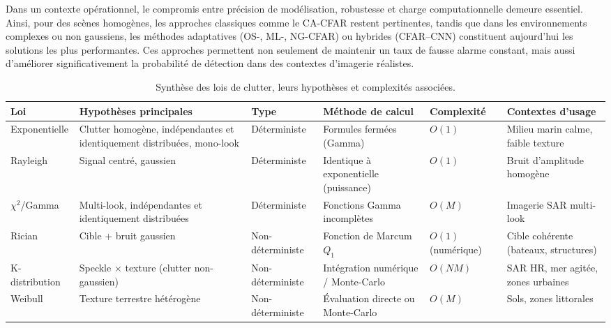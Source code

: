 Dans un contexte opérationnel, le compromis entre précision de modélisation, robustesse et charge computationnelle demeure essentiel.  
Ainsi, pour des scènes homogènes, les approches classiques comme le CA-CFAR restent pertinentes, tandis que dans les environnements complexes ou non gaussiens, les méthodes adaptatives (OS-, ML-, NG-CFAR) ou hybrides (CFAR–CNN) constituent aujourd’hui les solutions les plus performantes.  
Ces approches permettent non seulement de maintenir un taux de fausse alarme constant, mais aussi d’améliorer significativement la probabilité de détection dans des contextes d’imagerie réalistes.
\begin{table}[H]
\centering
\begin{tabular}{p{2.5cm}p{2.5cm}p{2.2cm}p{2.2cm}p{2cm}p{2cm}}
\toprule
\textbf{Loi} & \textbf{Hypothèses principales} & \textbf{Type} & \textbf{Méthode de calcul} & \textbf{Complexité} & \textbf{Contextes d’usage} \\
\midrule
Exponentielle & Clutter homogène, indépendantes et identiquement distribuées, mono-look & Déterministe & Formules fermées (Gamma) & $O(1)$ & Milieu marin calme, faible texture \\
Rayleigh & Signal centré, gaussien & Déterministe & Identique à exponentielle (puissance) & $O(1)$ & Bruit d’amplitude homogène \\
$\chi^2$/Gamma & Multi-look, indépendantes et identiquement distribuées & Déterministe & Fonctions Gamma incomplètes & $O(M)$ & Imagerie SAR multi-look \\
Rician & Cible + bruit gaussien & Non-déterministe & Fonction de Marcum $Q_1$ & $O(1)$ (numérique) & Cible cohérente (bateaux, structures) \\
K-distribution & Speckle × texture (clutter non-gaussien) & Non-déterministe & Intégration numérique / Monte-Carlo & $O(N\!M)$ & SAR HR, mer agitée, zones urbaines \\
Weibull & Texture terrestre hétérogène & Non-déterministe & Évaluation directe ou Monte-Carlo & $O(M)$ & Sols, zones littorales \\
\bottomrule
\end{tabular}
\caption{Synthèse des lois de clutter, leurs hypothèses et complexités associées.}
\end{table}




